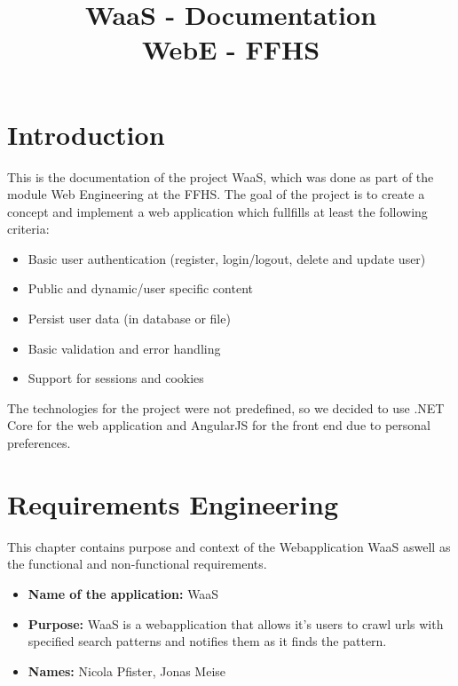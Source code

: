 \documentclass[titlepage, 12pt]{article}
\author{\authorName}
\title{WaaS - Documentation \\ \medskip \large WebE - FFHS}
\begin{document}
\maketitle

\pagebreak

\renewcommand{\contentsname}{Table of Contents}

\tableofcontents

\pagebreak

\section{Introduction}

This is the documentation of the project WaaS, which was done as part of the module Web Engineering at the FFHS. The goal of the project is to create a concept and implement a web application which fullfills at least the following criteria:

\begin{itemize}
    \item Basic user authentication (register, login/logout, delete and update user)
    \item Public and dynamic/user specific content
    \item Persist user data (in database or file)
    \item Basic validation and error handling
    \item Support for sessions and cookies
\end{itemize}

The technologies for the project were not predefined, so we decided to use .NET Core for the web application and AngularJS for the front end due to personal preferences.

\pagebreak

\section{Requirements Engineering\label{sectionRequirementsEngineering}}

This chapter contains purpose and context of the Webapplication WaaS aswell as the functional and non-functional requirements.

\begin{itemize}
  \item \textbf{Name of the application:} WaaS
  \item \textbf{Purpose:} WaaS is a webapplication that allows it's users to crawl urls with specified search patterns and notifies them as it finds the pattern.
  \item \textbf{Names:} Nicola Pfister, Jonas Meise
\end{itemize}
\end{document}
